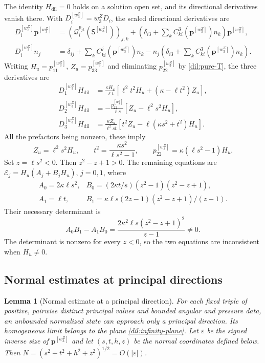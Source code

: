 \documentclass[11pt,a4paper]{article}
\numberwithin{equation}{section}
\theoremstyle{plain}
\newtheorem{lemma}[theorem]{Lemma}
\theoremstyle{definition}
\theoremstyle{remark}
\begin{document}
The identity $H_{\mathrm{dil}}=0$ holds on a solution open set, and its
directional derivatives vanish there. With $D_i^{[w_3^Z]}=w_3^ZD_i$, the scaled directional derivatives are
\begin{align*}
 D_i^{[w_3^Z]}\boldsymbol p^{[w_3^Z]}&=(\mathcal Q_i^{p_{jk}}(\mathsf S^{[w_3^Z]}))_{j,k}
   +\left(\delta_{i3}+\sum_k C^3_{ki}(\boldsymbol p^{[w_3^Z]})n_k\right)\boldsymbol p^{[w_3^Z]},\\
 D_i^{[w_3^Z]}n_j&=\delta_{ij}+\sum_kC^j_{ki}(\boldsymbol p^{[w_3^Z]})n_k
   -n_j\left(\delta_{i3}+\sum_k C^3_{ki}(\boldsymbol p^{[w_3^Z]})n_k\right).
\end{align*}
Writing $H_u=p_{11}^{[w_3^Z]}$, $Z_u=p_{33}^{[w_3^Z]}$ and eliminating $p_{22}^{[w_3^Z]}$ by
\eqref{dil:pure-T}, the three derivatives are
\begin{align}\label{dil:pure-derivatives}
 D_1^{[w_3^Z]}H_{\mathrm{dil}}&=\frac{\kappa H_u}{\ell t}
       [\ell^2t^2H_u+(\kappa-\ell t^2)Z_u],\\
 D_2^{[w_3^Z]}H_{\mathrm{dil}}&=-\frac{p_{22}^{[w_3^Z]}}{\ell s}[Z_u-\ell^2s^2H_u],\nonumber\\
 D_3^{[w_3^Z]}H_{\mathrm{dil}}&=\frac{\kappa Z_u}{\ell^2st}
       [t^2Z_u-\ell(\kappa s^2+t^2)H_u].\nonumber
\end{align}
All the prefactors being nonzero, these imply
\begin{equation}\label{dil:pure-direction}
 Z_u=\ell^2s^2H_u,\qquad
 t^2=\frac{\kappa s^2}{\ell s^2-1},\qquad
 p_{22}^{[w_3^Z]}=\kappa(\ell s^2-1)H_u.
\end{equation}
Set $z=\ell s^2<0$. Then $z^2-z+1>0$.  The remaining equations are
$\mathcal E_j=H_u(A_j+B_jH_u)$, $j=0,1$, where
\[
 \begin{array}{ll}
 A_0=2\kappa\ell s^2,&B_0=(2\kappa t/s)(z^2-1)(z^2-z+1),\\
 A_1=\ell t,&B_1=\kappa\ell s(2z-1)(z^2-z+1)/(z-1).
 \end{array}
\]
Their necessary determinant is
\begin{equation}\label{dil:pure-final-minor}
 A_0B_1-A_1B_0
   =\frac{2\kappa^2\ell s(z^2-z+1)^2}{z-1}\ne0.
\end{equation}
The determinant is nonzero for every $z<0$, so the two equations are inconsistent when $H_u\ne0$.

\subsection{Normal estimates at principal directions}
\label{adil:normal-estimate}
\begin{lemma}[Normal estimate at a principal direction]
\label{dil:normal-estimate}
For each fixed triple of positive, pairwise distinct principal
values and bounded angular and pressure data, an unbounded
normalized state can approach only a principal direction. Its
homogeneous limit belongs to the plane \eqref{dil:infinity-plane}.
Let $\varepsilon$ be the signed inverse size of
$\boldsymbol p^{[w_3^Z]}$ and let $(s,t,h,z)$ be the normal coordinates
defined below. Then $N=(s^2+t^2+h^2+z^2)^{1/2}=O(|\varepsilon|)$.
\end{lemma}
\end{document}
